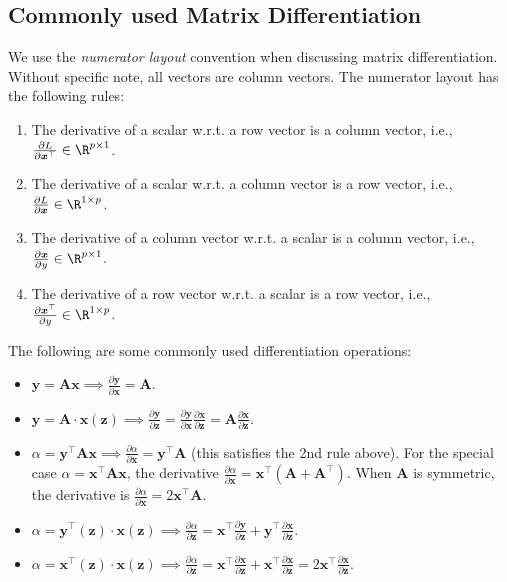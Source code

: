 

\subsection{Commonly used Matrix Differentiation}
    We use the \emph{numerator layout} convention when discussing matrix differentiation.
    Without specific note, all vectors are column vectors.
    The numerator layout has the following rules:
        \begin{enumerate}
            \item The derivative of a scalar w.r.t. a row vector is a column vector, i.e., $\frac{\partial L}{\partial \bm{x}^\top} \in \R^{\nfeat \times 1}$.
            \item The derivative of a scalar w.r.t. a column vector is a row vector, i.e., $\frac{\partial L}{\partial \bm{x} } \in \R^{1 \times \nfeat}$.
            \item The derivative of a column vector w.r.t. a scalar is a column vector, i.e., $\frac{\partial \bm{x}}{\partial y } \in \R^{ \nfeat \times 1}$.
            \item The derivative of a row vector w.r.t. a scalar is a row vector, i.e., $\frac{\partial \bm{x}^\top }{\partial y } \in \R^{ 1 \times \nfeat}$.
        \end{enumerate}
    The following are some commonly used differentiation operations:
        \begin{itemize}
            \item $\bm{y} = \bm{A} \bm{x} \implies \frac{\partial \bm{y}}{\partial \bm{x}} = \bm{A}$.
            \item $\bm{y} = \bm{A} \cdot  \bm{x}(\bm{z}) \implies \frac{\partial \bm{y}}{\partial \bm{z}} = \frac{\partial \bm{y}}{\partial \bm{x}} \frac{\partial \bm{x}}{\partial \bm{z}} = \bm{A} \frac{\partial \bm{x}}{\partial \bm{z}}$.
            \item $\alpha = \bm{y}^\top \bm{A} \bm{x} \implies \frac{\partial \alpha}{\partial \bm{x}} = \bm{y}^\top \bm{A}$ (this satisfies the 2nd rule above). For the special case $\alpha = \bm{x}^\top \bm{A} \bm{x}$, the derivative $\frac{\partial \alpha}{\partial \bm{x}} = \bm{x}^\top (\bm{A} + \bm{A}^\top)$. When $\bm{A}$ is symmetric, the derivative is $\frac{\partial \alpha}{\partial \bm{x}} = 2\bm{x}^\top \bm{A}$.
            \item $\alpha = \bm{y}^\top(\bm{z}) \cdot \bm{x}(\bm{z}) \implies \frac{\partial \alpha}{\partial \bm{z}} = \bm{x}^\top \frac{\partial \bm{y}}{\partial \bm{z}} + \bm{y}^\top \frac{\partial \bm{x}}{\partial \bm{z}}$.
            \item $\alpha = \bm{x}^\top(\bm{z}) \cdot \bm{x}(\bm{z}) \implies \frac{\partial \alpha}{\partial \bm{z}} = \bm{x}^\top \frac{\partial \bm{x}}{\partial \bm{z}} + \bm{x}^\top \frac{\partial \bm{x}}{\partial \bm{z}} = 2\bm{x}^\top \frac{\partial \bm{x}}{\partial \bm{z}}$.
        \end{itemize}
